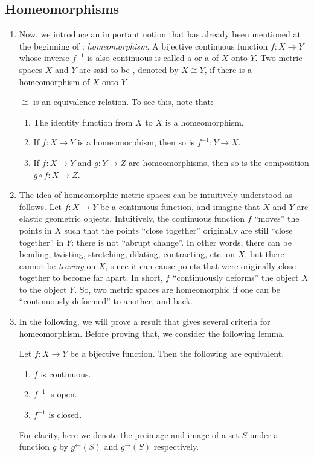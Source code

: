 \subsection{Homeomorphisms}
\begin{enumerate}
\item Now, we introduce an important notion that has already been mentioned at
the beginning of : \emph{homeomorphism}. A bijective
continuous function \(f:X\to Y\) whose inverse \(f^{-1}\) is also continuous is
called a  or a  of \(X\) onto
\(Y\). Two metric spaces \(X\) and \(Y\) are said to be ,
denoted by \(X\cong Y\), if there is a homeomorphism of \(X\) onto \(Y\).

\begin{note}
\(\cong\) is an equivalence relation. To see this, note that:
\begin{enumerate}
\item The identity function from \(X\) to \(X\) is a homeomorphism.
\item If \(f:X\to Y\) is a homeomorphism, then so is \(f^{-1}:Y\to X\).
\item If \(f:X\to Y\) and \(g:Y\to Z\) are homeomorphisms, then so is the
composition \(g\circ f:X\to Z\).
\end{enumerate}
\end{note}
\item The idea of homeomorphic metric spaces can be intuitively understood as
follows.  Let \(f:X\to Y\) be a continuous function, and imagine that \(X\) and
\(Y\) are elastic geometric objects. Intuitively, the continuous function \(f\)
``moves'' the points in \(X\) such that the points ``close together''
originally are still ``close together'' in \(Y\): there is not ``abrupt
change''. In other words, there can be bending, twisting, stretching, dilating,
contracting, etc. on \(X\), but there cannot be \emph{tearing} on \(X\), since
it can cause points that were originally close together to become far apart. In
short, \(f\) ``continuously deforms'' the object \(X\) to the object \(Y\). So,
two metric spaces are homeomorphic if one can be ``continuously deformed'' to
another, and back.

\item In the following, we will prove a result that gives several criteria for
homeomorphism. Before proving that, we consider the following lemma.

\begin{lemma}
\label{lma:bij-cts-crit}
Let \(f:X\to Y\) be a bijective function. Then the following are equivalent.
\begin{enumerate}
\item \(f\) is continuous.
\item \(f^{-1}\) is open.
\item \(f^{-1}\) is closed.
\end{enumerate}
\end{lemma}
\begin{pf}
For clarity, here we denote the preimage and image of a set \(S\) under a
function \(g\) by \(g^{\leftarrow}(S)\) and \(g^{\rightarrow}(S)\)
respectively.


\end{pf}
\end{enumerate}
